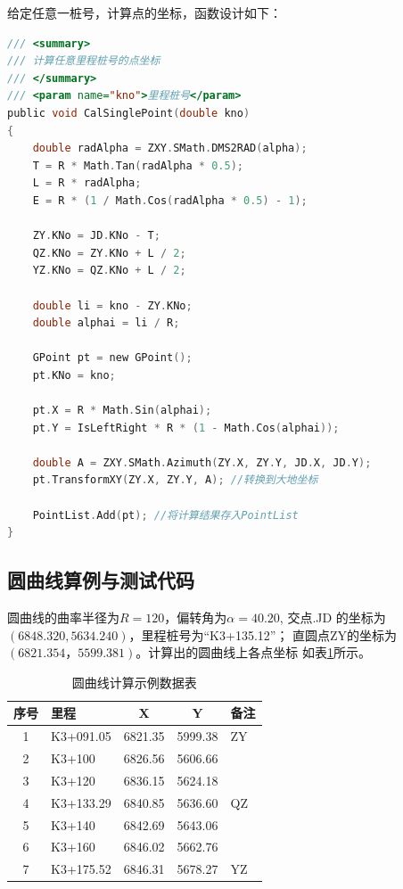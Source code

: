 给定任意一桩号，计算点的坐标，函数设计如下：
\begin{lstlisting}[language=C]
/// <summary>
/// 计算任意里程桩号的点坐标
/// </summary>
/// <param name="kno">里程桩号</param>
public void CalSinglePoint(double kno)
{
    double radAlpha = ZXY.SMath.DMS2RAD(alpha);
    T = R * Math.Tan(radAlpha * 0.5);
    L = R * radAlpha;
    E = R * (1 / Math.Cos(radAlpha * 0.5) - 1);

    ZY.KNo = JD.KNo - T;
    QZ.KNo = ZY.KNo + L / 2;
    YZ.KNo = QZ.KNo + L / 2;
    
    double li = kno - ZY.KNo;
    double alphai = li / R;
    
    GPoint pt = new GPoint();
    pt.KNo = kno;
    
    pt.X = R * Math.Sin(alphai);
    pt.Y = IsLeftRight * R * (1 - Math.Cos(alphai));
    
    double A = ZXY.SMath.Azimuth(ZY.X, ZY.Y, JD.X, JD.Y);
    pt.TransformXY(ZY.X, ZY.Y, A); //转换到大地坐标
    
    PointList.Add(pt); //将计算结果存入PointList
}
\end{lstlisting}

\subsection{圆曲线算例与测试代码}

圆曲线的曲率半径为$R = 120$，偏转角为$\alpha = 40.20$, 交点.JD
的坐标为$(6848.320, 5634.240)$，里程桩号为``K3+135.12''；
直圆点ZY的坐标为$(6821.354，5599.381)$。计算出的圆曲线上各点坐标
如表\ref{tab:YRoute}所示。

\begin{table}[htbp]
\centering
\caption{圆曲线计算示例数据表}
\label{tab:YRoute}
\begin{tabular}{clccl}
\hline
序号  &  里程    &     X       &   Y	 & 备注 \\
\hline
1    & K3+091.05 & 	6821.35   & 5999.38 &  ZY  \\
2    & K3+100	& 	6826.56	  & 5606.66 &      \\
3    & K3+120	&   6836.15	  & 5624.18 &      \\
4    & K3+133.29 & 	6840.85	  & 5636.60 &  QZ  \\
5    & K3+140	& 	6842.69	  & 5643.06 &      \\
6    & K3+160	& 	6846.02	  & 5662.76 &      \\
7    & K3+175.52 &  	6846.31	  & 5678.27 &  YZ  \\
\hline
\end{tabular}
\end{table}

